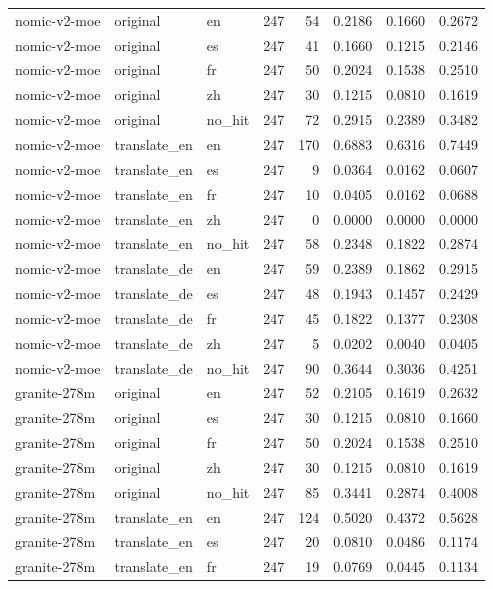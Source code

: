 \begin{tabular}{lllrrrrr}
nomic-v2-moe & original & en & 247 & 54 & 0.2186 & 0.1660 & 0.2672 \\
nomic-v2-moe & original & es & 247 & 41 & 0.1660 & 0.1215 & 0.2146 \\
nomic-v2-moe & original & fr & 247 & 50 & 0.2024 & 0.1538 & 0.2510 \\
nomic-v2-moe & original & zh & 247 & 30 & 0.1215 & 0.0810 & 0.1619 \\
nomic-v2-moe & original & no\_hit & 247 & 72 & 0.2915 & 0.2389 & 0.3482 \\
nomic-v2-moe & translate\_en & en & 247 & 170 & 0.6883 & 0.6316 & 0.7449 \\
nomic-v2-moe & translate\_en & es & 247 & 9 & 0.0364 & 0.0162 & 0.0607 \\
nomic-v2-moe & translate\_en & fr & 247 & 10 & 0.0405 & 0.0162 & 0.0688 \\
nomic-v2-moe & translate\_en & zh & 247 & 0 & 0.0000 & 0.0000 & 0.0000 \\
nomic-v2-moe & translate\_en & no\_hit & 247 & 58 & 0.2348 & 0.1822 & 0.2874 \\
nomic-v2-moe & translate\_de & en & 247 & 59 & 0.2389 & 0.1862 & 0.2915 \\
nomic-v2-moe & translate\_de & es & 247 & 48 & 0.1943 & 0.1457 & 0.2429 \\
nomic-v2-moe & translate\_de & fr & 247 & 45 & 0.1822 & 0.1377 & 0.2308 \\
nomic-v2-moe & translate\_de & zh & 247 & 5 & 0.0202 & 0.0040 & 0.0405 \\
nomic-v2-moe & translate\_de & no\_hit & 247 & 90 & 0.3644 & 0.3036 & 0.4251 \\
granite-278m & original & en & 247 & 52 & 0.2105 & 0.1619 & 0.2632 \\
granite-278m & original & es & 247 & 30 & 0.1215 & 0.0810 & 0.1660 \\
granite-278m & original & fr & 247 & 50 & 0.2024 & 0.1538 & 0.2510 \\
granite-278m & original & zh & 247 & 30 & 0.1215 & 0.0810 & 0.1619 \\
granite-278m & original & no\_hit & 247 & 85 & 0.3441 & 0.2874 & 0.4008 \\
granite-278m & translate\_en & en & 247 & 124 & 0.5020 & 0.4372 & 0.5628 \\
granite-278m & translate\_en & es & 247 & 20 & 0.0810 & 0.0486 & 0.1174 \\
granite-278m & translate\_en & fr & 247 & 19 & 0.0769 & 0.0445 & 0.1134 \\

\end{tabular}
